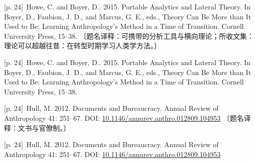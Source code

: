 \documentclass[10pt,a4paper]{article}
\begin{document}
\noindent\begin{minipage}{\textwidth}\begin{minipage}[t]{\dimexpr.5\textwidth-4mm\relax}\noindent\begin{minipage}[t]{\linewidth}{\scriptsize\color{gray} [p. 24]}\ Howe, C. and Boyer, D.. 2015. Portable Analytics and Lateral Theory. In Boyer, D., Faubion, J. D., and Marcus, G. E., eds., Theory Can Be More than It Used to Be: Learning Anthropology’s Method in a Time of Transition. Cornell University Press, 15–38. 〔题名译释：可携带的分析工具与横向理论；所收文集：理论可以超越往昔：在转型时期学习人类学方法。〕\par\end{minipage}\par\end{minipage}\hfill\begin{minipage}[t]{\dimexpr.5\textwidth-4mm\relax}\noindent\begin{minipage}[t]{\linewidth}{\scriptsize\color{gray} [p. 24]}\ Howe, C. and Boyer, D.. 2015. Portable Analytics and Lateral Theory. In Boyer, D., Faubion, J. D., and Marcus, G. E., eds., Theory Can Be More than It Used to Be: Learning Anthropology’s Method in a Time of Transition. Cornell University Press, 15–38.\par\end{minipage}\par\end{minipage}\end{minipage}\par
\noindent\begin{minipage}{\textwidth}\begin{minipage}[t]{\dimexpr.5\textwidth-4mm\relax}\noindent\begin{minipage}[t]{\linewidth}{\scriptsize\color{gray} [p. 24]}\ Hull, M. 2012. Documents and Bureaucracy. Annual Review of Anthropology 41: 251–67. DOI: \url{10.1146/annurev.anthro.012809.104953} 〔题名译释：文书与官僚制。〕\par\end{minipage}\par\end{minipage}\hfill\begin{minipage}[t]{\dimexpr.5\textwidth-4mm\relax}\noindent\begin{minipage}[t]{\linewidth}{\scriptsize\color{gray} [p. 24]}\ Hull, M. 2012. Documents and Bureaucracy. Annual Review of Anthropology 41: 251–67. DOI: \url{10.1146/annurev.anthro.012809.104953}\par\end{minipage}\par\end{minipage}\end{minipage}\par
\end{document}
